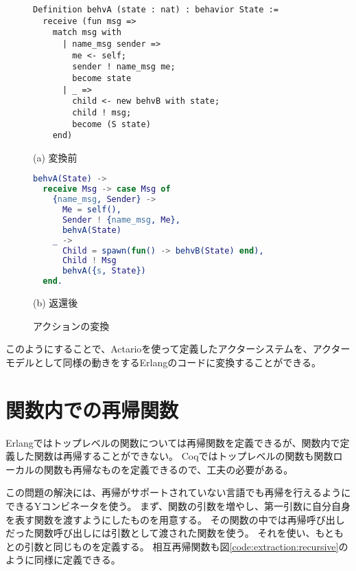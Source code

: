 \begin{figure}\centering
\begin{minipage}{1\textwidth}\centering
\begin{lstlisting}[frame=single,numbers=none,xleftmargin=0pt]
Definition behvA (state : nat) : behavior State :=
  receive (fun msg =>
    match msg with
      | name_msg sender =>
        me <- self;
        sender ! name_msg me;
        become state
      | _ =>
        child <- new behvB with state;
        child ! msg;
        become (S state)
    end)
\end{lstlisting}
(a) 変換前
\end{minipage}
\begin{minipage}{1\textwidth}\centering
\begin{lstlisting}[frame=single,numbers=none,xleftmargin=0pt,language=Erlang]
behvA(State) ->
  receive Msg -> case Msg of
    {name_msg, Sender} ->
      Me = self(),
      Sender ! {name_msg, Me},
      behvA(State)
    _ ->
      Child = spawn(fun() -> behvB(State) end),
      Child ! Msg
      behvA({s, State})
  end.
\end{lstlisting}
(b) 返還後
\end{minipage}
\label{code:extraction:action}
\caption{アクションの変換}
\end{figure}

このようにすることで、Actarioを使って定義したアクターシステムを、アクターモデルとして同様の動きをするErlangのコードに変換することができる。

\section{関数内での再帰関数}

Erlangではトップレベルの関数については再帰関数を定義できるが、関数内で定義した関数は再帰することができない。
Coqではトップレベルの関数も関数ローカルの関数も再帰なものを定義できるので、工夫の必要がある。

この問題の解決には、再帰がサポートされていない言語でも再帰を行えるようにできるYコンビネータを使う。
まず、関数の引数を増やし、第一引数に自分自身を表す関数を渡すようにしたものを用意する。
その関数の中では再帰呼び出しだった関数呼び出しには引数として渡された関数を使う。
それを使い、もともとの引数と同じものを定義する。
相互再帰関数も図\ref{code:extraction:recursive}のように同様に定義できる。

